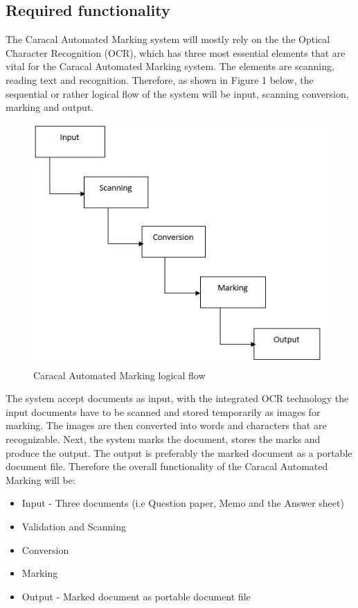 \documentclass{article}
\begin{document}



	\subsection{Required functionality}
	
The Caracal Automated Marking system will mostly rely on the the Optical Character Recognition (OCR), which has three most essential elements that are vital for the Caracal Automated Marking system. The elements are scanning, reading text and recognition. Therefore, as shown in Figure 1 below, the sequential or rather logical flow of the system will be input, scanning conversion, marking and output.

\begin{figure}[t]
	\includegraphics[width=\linewidth]{flow.PNG}
	\caption{Caracal Automated Marking logical flow}
\end{figure}


The system accept documents as input, with the integrated OCR technology the input documents have to be scanned and stored temporarily as images for marking. The images are then converted into words and characters that are recognizable. Next, the system marks the document, stores the marks and produce the output. The output is preferably the marked document as a portable document file. Therefore the overall functionality of the Caracal Automated Marking will be:
	\begin{itemize}
		\item Input - Three documents (i.e Question paper, Memo and the Answer sheet)
		\item Validation and Scanning
		\item Conversion
		\item Marking
		\item Output - Marked document as portable document file
	\end{itemize}
\clearpage
\end{document}
